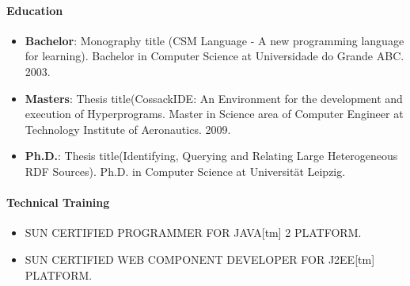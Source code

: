 \paragraph{Education}

\begin{itemize}
    \item \textbf{Bachelor}: Monography title (CSM Language - A new programming language for learning). Bachelor in Computer Science at Universidade do Grande ABC. 2003.
    \item \textbf{Masters}: Thesis title(CossackIDE: An Environment for the development and execution of Hyperprograms. Master in Science area of Computer Engineer at Technology Institute of Aeronautics. 2009.
    \item \textbf{Ph.D.}: Thesis title(Identifying, Querying and Relating Large Heterogeneous RDF Sources). Ph.D. in Computer Science at Universität Leipzig.
\end{itemize}

\paragraph{Technical Training}

\begin{itemize}
	\item SUN CERTIFIED PROGRAMMER FOR JAVA[tm] 2 PLATFORM.
	\item SUN CERTIFIED WEB COMPONENT DEVELOPER FOR J2EE[tm] PLATFORM.
\end{itemize}\par
